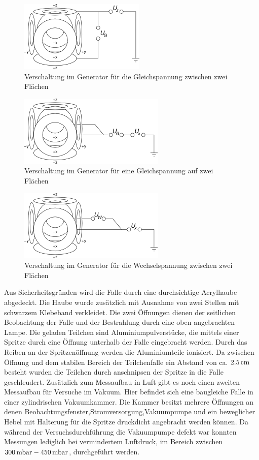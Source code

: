 \documentclass[a4paper,12pt]{article}
\begin{document}
\begin{figure}[htb]
		\centering
		\includegraphics{Schaltbild_Z_Kompensation.png}
		\caption{Verschaltung im Generator für die Gleichspannung zwischen zwei Flächen}
		\label{verschaltungz}
\end{figure}

\begin{figure}[htb]
		\centering
		\includegraphics{Schaltbild_Stabilitaet.png}
		\caption{Verschaltung im Generator für eine Gleichspannung auf zwei Flächen}
		\label{verschaltungstab}
\end{figure}

\begin{figure}[htb]
		\centering
		\includegraphics{Schaltbild_Wechselspannung.png}
		\caption{Verschaltung im Generator für die Wechselspannung zwischen zwei Flächen}
		\label{verschaltungres}
\end{figure}
Aus Sicherheitsgründen wird die Falle durch eine durchsichtige Acrylhaube abgedeckt.
Die Haube wurde zusätzlich mit Ausnahme von zwei Stellen mit schwarzem Klebeband verkleidet.
Die zwei Öffnungen dienen der seitlichen Beobachtung der Falle und der Bestrahlung durch eine oben angebrachten Lampe.
Die geladen Teilchen sind Aluminiumpulverstücke, die mittels einer Spritze durch eine Öffnung unterhalb der Falle eingebracht werden.
Durch das Reiben an der Spritzenöffnung werden die Aluminiumteile ionisiert.
Da zwischen Öffnung und dem stabilen Bereich der Teilchenfalle ein Abstand von ca. $\unit[2.5]{cm}$  besteht wurden die Teilchen durch anschnipsen der Spritze in die Falle geschleudert.
Zusätzlich zum Messaufbau in Luft gibt es noch einen zweiten Messaufbau für Versuche im Vakuum. Hier befindet sich eine baugleiche Falle in einer zylindrischen Vakuumkammer.
Die Kammer besitzt mehrere Öffnungen an denen Beobachtungsfenster,Stromversorgung,Vakuumpumpe und ein beweglicher Hebel mit Halterung für die Spritze druckdicht angebracht werden können.
 Da während der Versuchsdurchführung die Vakuumpumpe defekt war 
konnten Messungen lediglich bei vermindertem Luftdruck, im Bereich zwischen $\unit[300]{mbar} - \unit[450]{mbar}$, durchgeführt werden.  
\end{document}
